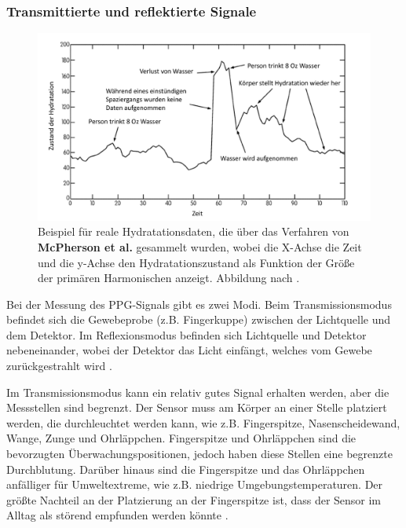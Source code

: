 \documentclass[10pt,a4paper,headinclude,twoside, plainheadsepline, open=right, numbers=noenddot, twocolumn]{article}
\begin{document}
\subsubsection{Transmittierte und reflektierte Signale}
\label{transmittierte und reflektierte signale}

\begin{figure}[ht]
	\centering
	\includegraphics[width=\linewidth]{images/hydratationsdaten.pdf}
	\caption{Beispiel für reale Hydratationsdaten, die über das Verfahren von \textbf{McPherson et al.} gesammelt wurden, wobei die X-Achse die Zeit und die y-Achse den Hydratationszustand als Funktion der Größe der primären Harmonischen anzeigt. Abbildung nach \cite{mcpherson2015systems}.}
	\label{hydratationszustand}
\end{figure}

Bei der Messung des PPG-Signals gibt es zwei Modi.
Beim Transmissionsmodus befindet sich die Gewebeprobe (z.B. Fingerkuppe) zwischen der Lichtquelle und dem Detektor.
Im Reflexionsmodus befinden sich Lichtquelle und Detektor nebeneinander, wobei der Detektor das Licht einfängt, welches vom Gewebe zurückgestrahlt wird \cite{john2007photopletysmography}.

Im Transmissionsmodus kann ein relativ gutes Signal erhalten werden, aber die Messstellen sind begrenzt.
Der Sensor muss am Körper an einer Stelle platziert werden, die durchleuchtet werden kann, wie z.B. Fingerspitze, Nasenscheidewand, Wange, Zunge und Ohrläppchen.
Fingerspitze und Ohrläppchen sind die bevorzugten Überwachungspositionen, jedoch haben diese Stellen eine begrenzte Durchblutung.
Darüber hinaus sind die Fingerspitze und das Ohrläppchen anfälliger für Umweltextreme, wie z.B. niedrige Umgebungstemperaturen.
Der größte Nachteil an der Platzierung an der Fingerspitze ist, dass der Sensor im Alltag als störend empfunden werden könnte \cite{tamura2014wearable}.
\end{document}
